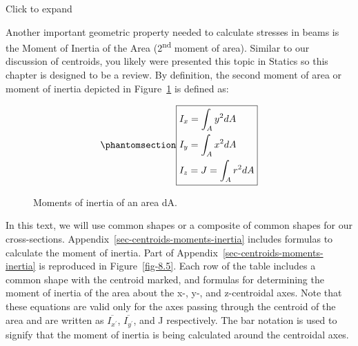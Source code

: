 \documentclass[
  letterpaper,
  DIV=11,
  numbers=noendperiod]{scrreprt}
\theoremstyle{definition}
\theoremstyle{remark}
\begin{document}
Click to expand

Another important geometric property needed to calculate stresses in
beams is the Moment of Inertia of the Area (2\textsuperscript{nd} moment
of area). Similar to our discussion of centroids, you likely were
presented this topic in Statics so this chapter is designed to be a
review. By definition, the second moment of area or moment of inertia
depicted in Figure~\ref{fig-8.4} is defined as:

\begin{equation}\phantomsection\label{eq-8.2}{
\boxed{\begin{aligned}
&I_x=\int_A y^2 d A \\
&I_y=\int_A x^2 d A \\
&I_z=J=\int_A r^2 d A \\
\end{aligned}}
}\end{equation}

\begin{figure}


\caption{\label{fig-8.4}Moments of inertia of an area dA.}

\end{figure}%

In this text, we will use common shapes or a composite of common shapes
for our cross-sections. Appendix~\ref{sec-centroids-moments-inertia}
includes formulas to calculate the moment of inertia. Part of
Appendix~\ref{sec-centroids-moments-inertia} is reproduced in
Figure~\ref{fig-8.5}. Each row of the table includes a common shape with
the centroid marked, and formulas for determining the moment of inertia
of the area about the x-, y-, and z-centroidal axes. Note that these
equations are valid only for the axes passing through the centroid of
the area and are written as \(\overline{I_{x^{\prime}}}\),
\(\overline{I_{y^{\prime}}}\), and J respectively. The bar notation is
used to signify that the moment of inertia is being calculated around
the centroidal axes.
\end{document}

